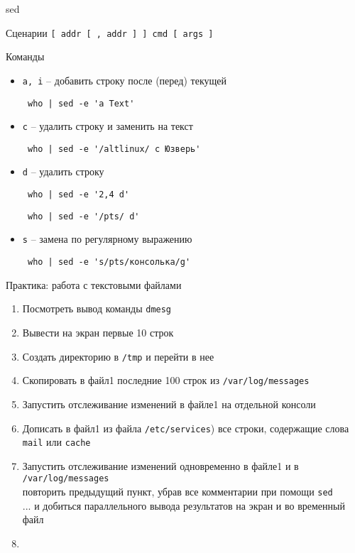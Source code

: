 \begin{frame}[fragile]{sed}
	\begin{block}{Сценарии}
		{\tt [ addr [ ,  addr ] ] cmd [ args ]}
	\end{block}

	\small
	\begin{block}{Команды}
		\begin{itemize}
		  \item {\tt a, i} -- добавить строку после (перед) текущей
			  \begin{verbatim} who | sed -e 'a Text' \end{verbatim}
		  \item {\tt c} -- удалить строку и заменить на текст
			  \begin{verbatim} who | sed -e '/altlinux/ c Юзверь' \end{verbatim}
		  \item {\tt d} -- удалить строку
			  \begin{verbatim} who | sed -e '2,4 d' \end{verbatim}
			  \begin{verbatim} who | sed -e '/pts/ d' \end{verbatim}
		  \item {\tt s} -- замена по регулярному выражению
			  \begin{verbatim} who | sed -e 's/pts/консолька/g' \end{verbatim}
		\end{itemize}
	\end{block}
\end{frame}


\begin{frame}[fragile]{Практика: работа с текстовыми файлами}
  \begin{enumerate}
	  \item Посмотреть вывод команды {\tt dmesg}
	  \item Вывести на экран первые 10 строк 
		  \pause
	  \item Создать директорию в {\tt /tmp} и перейти в нее
	  \item Скопировать в файл1 последние 100 строк из {\tt /var/log/messages}
	  \item Запустить отслеживание изменений в файле1 на отдельной консоли
	  \item Дописать в файл1 из файла {\tt /etc/services}) все строки,
		  содержащие слова {\tt mail} или {\tt cache}
		  \pause
	  \item Запустить отслеживание изменений одновременно в файле1 и в {\tt /var/log/messages}\\
		  \pause
			повторить предыдущий пункт, убрав все комментарии при помощи {\tt sed}\\
		  \pause
		  ... и добиться параллельного вывода результатов на экран и во временный файл
	  \item
  \end{enumerate}
\end{frame}

